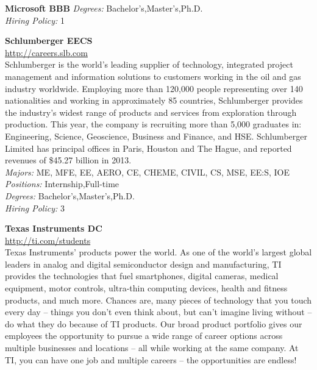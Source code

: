 \documentclass[twoside]{article}
\begin{document}
\begin{center}
\begin{multicols}{2}
\begin{minipage}{.95\columnwidth}{\Large\bf Microsoft \hfill BBB}
    \emph{Degrees:} Bachelor's,Master's,Ph.D.\\
    \emph{Hiring Policy:} 1\\
\end{minipage}
 \begin{minipage}{.95\columnwidth}{\Large\bf Schlumberger \hfill EECS}\\
    \url{http://careers.slb.com}\\
    Schlumberger is the world’s leading supplier of technology, integrated project management and information solutions to customers working in the oil and gas industry worldwide. Employing more than 120,000 people representing over 140 nationalities and working in approximately 85 countries, Schlumberger provides the industry’s widest range of products and services from exploration through production. This year, the company is recruiting more than 5,000 graduates in: Engineering, Science, Geoscience, Business and Finance, and HSE. Schlumberger Limited has principal offices in Paris, Houston and The Hague, and reported revenues of \$45.27 billion in 2013.\\
    \emph{Majors:} ME, MFE, EE, AERO, CE, CHEME, CIVIL, CS, MSE, EE:S, IOE\\
    \emph{Positions:} Internship,Full-time\\
    \emph{Degrees:} Bachelor's,Master's,Ph.D.\\
    \emph{Hiring Policy:} 3\\
\end{minipage}
 \begin{minipage}{.95\columnwidth}{\Large\bf Texas Instruments \hfill DC}\\
    \url{http://ti.com/students}\\
    Texas Instruments’ products power the world. As one of the world’s largest global leaders in analog and digital semiconductor design and manufacturing, TI provides the technologies that fuel smartphones, digital cameras, medical equipment, motor controls, ultra-thin computing devices, health and fitness products, and much more. Chances are, many pieces of technology that you touch every day – things you don’t even think about, but can’t imagine living without – do what they do because of TI products. Our broad product portfolio gives our employees the opportunity to pursue a wide range of career options across multiple businesses and locations – all while working at the same company. At TI, you can have one job and multiple careers – the opportunities are endless!\\

\end{minipage}
\end{multicols}
\end{center}
\end{document}
